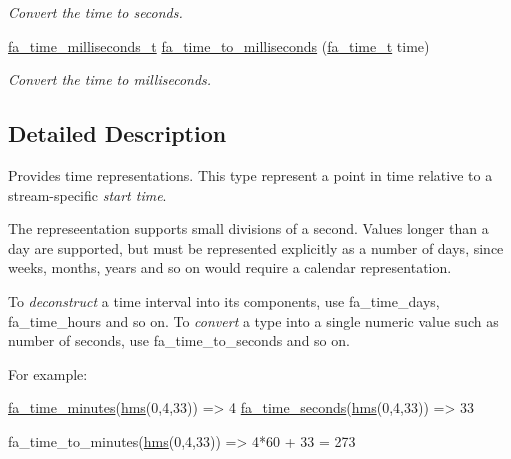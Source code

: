 \begin{DoxyCompactItemize}
\begin{DoxyCompactList}\small\item\em Convert the time to seconds. \end{DoxyCompactList}\item 
\hyperlink{group___fa_time_gadebdebeab6c5ba7cd8002d0773635e61}{fa\-\_\-time\-\_\-milliseconds\-\_\-t} \hyperlink{group___fa_time_ga99daa4bb229e91950d0c788bda5a1c86}{fa\-\_\-time\-\_\-to\-\_\-milliseconds} (\hyperlink{group___fa_time_ga227cc693f20b4873fed11028bcade184}{fa\-\_\-time\-\_\-t} time)
\begin{DoxyCompactList}\small\item\em Convert the time to milliseconds. \end{DoxyCompactList}\end{DoxyCompactItemize}


\subsection{Detailed Description}
Provides time representations. This type represent a point in time relative to a stream-\/specific {\itshape start time}.

The represeentation supports small divisions of a second. Values longer than a day are supported, but must be represented explicitly as a number of days, since weeks, months, years and so on would require a calendar representation.

To {\itshape deconstruct} a time interval into its components, use {\ttfamily fa\-\_\-time\-\_\-days}, {\ttfamily fa\-\_\-time\-\_\-hours} and so on. To {\itshape convert} a type into a single numeric value such as number of seconds, use {\ttfamily fa\-\_\-time\-\_\-to\-\_\-seconds} and so on.

For example\-:


\begin{DoxyCode}
\hyperlink{group___fa_time_gaa98eaf9f06048f5529a5b938eba9bb82}{fa\_time\_minutes}(\hyperlink{util_8h_a7e8aef59b2725d985f4fdfeb7bbe76c7}{hms}(0,4,33))    => 4
\hyperlink{group___fa_time_gab0b34c9051a7f4ae5c8edcc175122491}{fa\_time\_seconds}(\hyperlink{util_8h_a7e8aef59b2725d985f4fdfeb7bbe76c7}{hms}(0,4,33))    => 33

fa\_time\_to\_minutes(\hyperlink{util_8h_a7e8aef59b2725d985f4fdfeb7bbe76c7}{hms}(0,4,33)) => 4*60 + 33 = 273
\end{DoxyCode}


